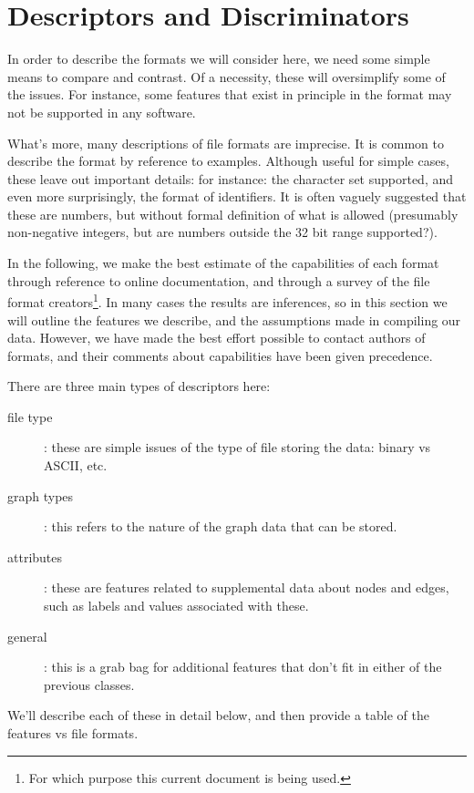 \documentclass{sig-alternate}
\begin{document}
\section{Descriptors and Discriminators}

In order to describe the formats we will consider here, we need some
simple means to compare and contrast.  Of a necessity, these will
oversimplify some of the issues. For instance, some features that
exist in principle in the format may not be supported in any
software.

What's more, many descriptions of file formats are imprecise. It is
common to describe the format by reference to examples. Although
useful for simple cases, these leave out important details: for
instance: the character set supported, and even more surprisingly, the
format of identifiers. It is often vaguely suggested that these are
numbers, but without formal definition of what is allowed (presumably
non-negative integers, but are numbers outside the 32 bit range
supported?). 

In the following, we make the best estimate of the capabilities of
each format through reference to online documentation, and through a
survey of the file format creators\footnote{For which purpose this
  current document is being used.}. In many cases the results are
inferences, so in this section we will outline the features we
describe, and the assumptions made in compiling our data. However, we
have made the best effort possible to contact authors of formats, and
their comments about capabilities have been given precedence.

There are three main types of descriptors here: 
\begin{description}

\item[file type]: these are simple issues of the type of file storing
  the data: binary vs ASCII, etc.
 
\item[graph types]: this refers to the nature of the graph data that
  can be stored.

\item[attributes]: these are features related to supplemental data
  about nodes and edges, such as labels and values associated with
  these.

\item[general]: this is a grab bag for additional features that don't
  fit in either of the previous classes.

\end{description}
We'll describe each of these in detail below, and then provide a table
of the features vs file formats.
\end{document}
